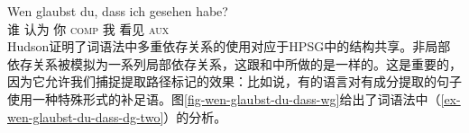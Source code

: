 \ea
\label{ex-wen-glaubst-du-dass-dg-two}
\gll Wen glaubst du, dass ich gesehen habe?\\
     谁 认为 你 \textsc{comp} 我 看见 \textsc{aux}\\
\z
Hudson证明了词语法\indexwgc 中多重依存关系的使用对应于HPSG\indexhpsgc 中的结构共享\citep[]{Hudson97a}。非局部依存关系被模拟为一系列局部依存关系，这跟\gpsgc 和\hpsgc 中所做的是一样的。这是重要的，因为它允许我们捕捉提取路径标记的效果\citep*[--2, \S~3.2]{BMS2001a}：比如说，有的语言对有成分提取的句子使用一种特殊形式的补足语。图\vref{fig-wen-glaubst-du-dass-wg}给出了词语法中（\ref{ex-wen-glaubst-du-dass-dg-two}）的分析。
